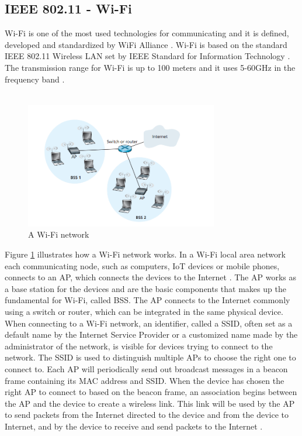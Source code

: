 \subsection{IEEE 802.11 - \gls{Wi-Fi}}
\gls{Wi-Fi} \cite{WiFiAlliance} is one of the most used technologies for communicating and it is defined, developed and standardized by WiFi Alliance \cite{WiFiAlliance}. \gls{Wi-Fi} is based on the standard IEEE 802.11 Wireless LAN set by IEEE Standard for Information Technology \cite{WifiStandard}. The transmission range for \gls{Wi-Fi} is up to 100 meters and it uses 5-60GHz in the frequency band \cite{IAQMonitorCommunicationReview}.
\\\\
\begin{figure} [H]
    \centering
    \includegraphics[width=0.75\textwidth]{figures/WiFiStandard.png}
    \caption{A \gls{Wi-Fi} network \cite{Datacom}}
    \label{fig:WiFiStandard}
\end{figure}
Figure \ref{fig:WiFiStandard} illustrates how a \gls{Wi-Fi} network works. In a \gls{Wi-Fi} local area network each communicating node, such as computers, \gls{IoT} devices or mobile phones, connects to an \gls{AP}, which connects the devices to the Internet \cite{Datacom}. The \gls{AP} works as a base station for the devices and are the basic components that makes up the fundamental for \gls{Wi-Fi}, called \gls{BSS}. The \gls{AP} connects to the Internet commonly using a switch or router, which can be integrated in the same physical device. When connecting to a \gls{Wi-Fi} network, an identifier, called a \gls{SSID}, often set as a default name by the Internet Service Provider or a customized name made by the administrator of the network, is visible for devices trying to connect to the network. The \gls{SSID} is used to distinguish multiple \gls{AP}s to choose the right one to connect to. Each \gls{AP} will periodically send out broadcast messages in a beacon frame containing its \gls{MAC} address and \gls{SSID}. When the device has chosen the right \gls{AP} to connect to based on the beacon frame, an association begins between the \gls{AP} and the device to create a wireless link. This link will be used by the \gls{AP} to send packets from the Internet directed to the device and from the device to Internet, and by the device to receive and send packets to the Internet \cite{Datacom}. 

